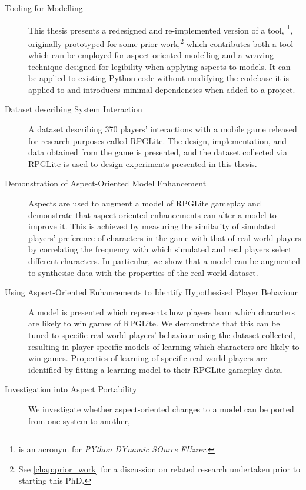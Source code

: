\begin{description}
  \item[Tooling for \AspectOriented{} Modelling] This thesis presents a
    redesigned and re-implemented version of a tool, \pdsf{}\footnote{\pdsf{} is
    an acronym for \emph{PYthon DYnamic SOurce FUzzer}.}, originally prototyped
    for some prior work,\footnote{See \cref{chap:prior_work} for a discussion on
    related research undertaken prior to starting this PhD.} which contributes
    both a tool which can be employed for aspect-oriented modelling and a
    weaving technique designed for legibility when applying aspects to models.
    It can be applied to existing Python code without modifying the codebase it
    is applied to and introduces minimal dependencies when added to a project.
  \item[Dataset describing \SocioTechnical System Interaction] A dataset
    describing 370 players' interactions with a mobile game released for
    research purposes called RPGLite. The design, implementation, and data
    obtained from the game is presented, and the dataset collected via RPGLite
    is used to design experiments presented in this thesis.
  \item[Demonstration of Aspect-Oriented Model Enhancement] Aspects are used to
    augment a model of RPGLite gameplay and demonstrate that aspect-oriented
    enhancements can alter a model to improve it. This is achieved by measuring
    the similarity of simulated players' preference of characters in the game
    with that of real-world players by correlating the frequency with which
    simulated and real players select different characters. In particular, we
    show that a model can be augmented to synthesise data with the properties of
    the real-world dataset.
  \item[Using Aspect-Oriented Enhancements to Identify Hypothesised Player
    Behaviour] A model is presented which represents how players learn which
    characters are likely to win games of RPGLite. We demonstrate that this can
    be tuned to specific real-world players' behaviour using the dataset
    collected, resulting in player-specific models of learning which characters
    are likely to win games. Properties of learning of specific real-world
    players are identified by fitting a learning model to their RPGLite gameplay
    data.
  \item[Investigation into Aspect Portability] We investigate whether
    aspect-oriented changes to a model can be ported from one system to another,

\end{description}
